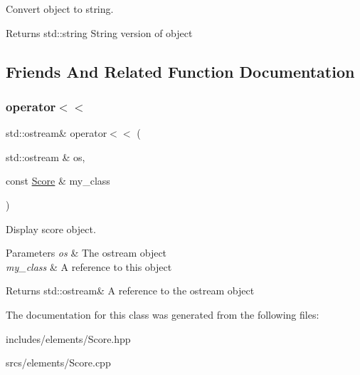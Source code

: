 Convert object to string. 

\begin{DoxyReturn}{Returns}
std\+::string String version of object 
\end{DoxyReturn}


\subsection{Friends And Related Function Documentation}
\mbox{\label{class_score_ab72dbd7e1916741d6f5d91b38631dcff}} 
\subsubsection{\texorpdfstring{operator$<$$<$}{operator<<}}
{\footnotesize\ttfamily std\+::ostream\& operator$<$$<$ (\begin{DoxyParamCaption}\item[{std\+::ostream \&}]{os,  }\item[{const \hyperlink{class_score}{Score} \&}]{my\+\_\+class }\end{DoxyParamCaption})\hspace{0.3cm}{\ttfamily [friend]}}



Display score object. 


\begin{DoxyParams}{Parameters}
{\em os} & The ostream object \\
\hline
{\em my\+\_\+class} & A reference to \textquotesingle{}this\textquotesingle{} object \\
\hline
\end{DoxyParams}
\begin{DoxyReturn}{Returns}
std\+::ostream\& A reference to the ostream object 
\end{DoxyReturn}


The documentation for this class was generated from the following files\+:\begin{DoxyCompactItemize}
\item 
includes/elements/Score.\+hpp\item 
srcs/elements/Score.\+cpp\end{DoxyCompactItemize}
